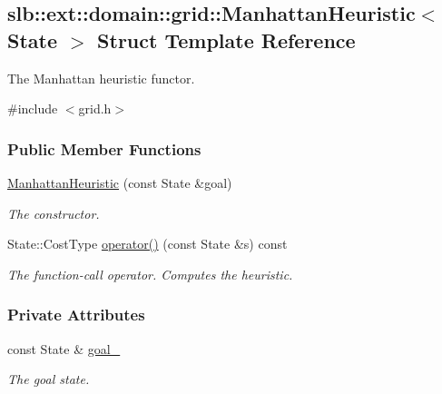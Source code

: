\hypertarget{structslb_1_1ext_1_1domain_1_1grid_1_1ManhattanHeuristic}{}\subsection{slb\+:\+:ext\+:\+:domain\+:\+:grid\+:\+:Manhattan\+Heuristic$<$ State $>$ Struct Template Reference}
\label{structslb_1_1ext_1_1domain_1_1grid_1_1ManhattanHeuristic}


The Manhattan heuristic functor.  




{\ttfamily \#include $<$grid.\+h$>$}

\subsubsection*{Public Member Functions}
\begin{DoxyCompactItemize}
\item 
\hyperlink{structslb_1_1ext_1_1domain_1_1grid_1_1ManhattanHeuristic_acc8282df73a62c0a56bd4ea06a685855}{Manhattan\+Heuristic} (const State \&goal)
\begin{DoxyCompactList}\small\item\em The constructor. \end{DoxyCompactList}\item 
State\+::\+Cost\+Type \hyperlink{structslb_1_1ext_1_1domain_1_1grid_1_1ManhattanHeuristic_a3a93f0602e821bcc72073b6118e59b51}{operator()} (const State \&s) const 
\begin{DoxyCompactList}\small\item\em The function-\/call operator. Computes the heuristic. \end{DoxyCompactList}\end{DoxyCompactItemize}
\subsubsection*{Private Attributes}
\begin{DoxyCompactItemize}
\item 
const State \& \hyperlink{structslb_1_1ext_1_1domain_1_1grid_1_1ManhattanHeuristic_a0432b870e3476b5c267cdbece62515da}{goal\+\_\+}\hypertarget{structslb_1_1ext_1_1domain_1_1grid_1_1ManhattanHeuristic_a0432b870e3476b5c267cdbece62515da}{}\label{structslb_1_1ext_1_1domain_1_1grid_1_1ManhattanHeuristic_a0432b870e3476b5c267cdbece62515da}

\begin{DoxyCompactList}\small\item\em The goal state. \end{DoxyCompactList}\end{DoxyCompactItemize}


